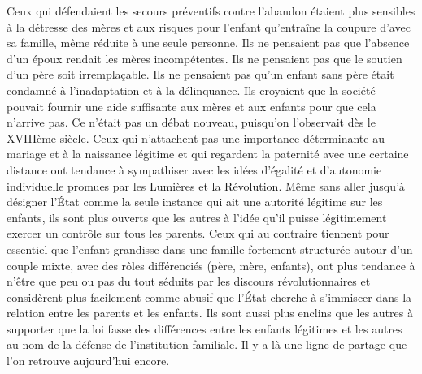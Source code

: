  Ceux qui défendaient les secours préventifs contre l'abandon étaient plus sensibles à la détresse des mères et aux risques pour l'enfant qu'entraîne la coupure d'avec sa famille, même réduite à une seule personne. Ils ne pensaient pas que l'absence d'un époux rendait les mères incompétentes. Ils ne pensaient pas que le soutien d'un père soit irremplaçable. Ils ne pensaient pas qu'un enfant sans père était condamné à l'inadaptation et à la délinquance. Ils croyaient que la société pouvait fournir une aide suffisante aux mères et aux enfants pour que cela n'arrive pas. Ce n'était pas un débat nouveau, puisqu'on l'observait dès le XVIIIème siècle. Ceux qui n'attachent pas une importance déterminante au mariage et à la naissance légitime et qui regardent la paternité avec une certaine distance ont tendance à sympathiser avec les idées d'égalité et d'autonomie individuelle promues par les Lumières et la Révolution. Même sans aller jusqu'à désigner l'État comme la seule instance qui ait une autorité légitime sur les enfants, ils sont plus ouverts que les autres à l'idée qu'il puisse légitimement exercer un contrôle sur tous les parents. Ceux qui au contraire tiennent pour essentiel que l'enfant grandisse dans une famille fortement structurée autour d'un couple mixte, avec des rôles différenciés (père, mère, enfants), ont plus tendance à n'être que peu ou pas du tout séduits par les discours révolutionnaires et considèrent plus facilement comme abusif que l'État cherche à s'immiscer dans la relation entre les parents et les enfants. Ils sont aussi plus enclins que les autres à supporter que la loi fasse des différences entre les enfants légitimes et les autres au nom de la défense de l'institution familiale. Il y a là une ligne de partage que l'on retrouve aujourd'hui encore.
 
